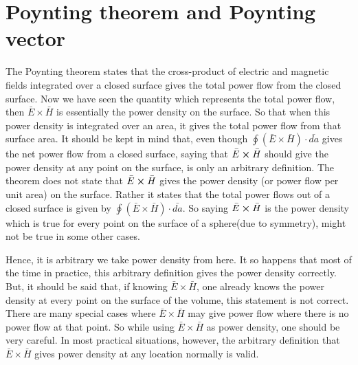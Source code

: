 \section{Poynting theorem and Poynting vector}
The Poynting theorem states that the cross-product of electric and magnetic fields integrated over a closed surface gives the total power flow from the closed surface. Now we have seen the quantity which represents the total power flow, then $\bar{E}\times\bar{H}$ is essentially the power density on the surface. So that when this power density is integrated over an area, it gives the total power flow from that surface area.
It should be kept in mind that, even though $ \oint(\bar{E}\times\bar{H})\cdot\bar{da} $ gives the net power flow from a closed surface, saying that $\bar{E}\cross\bar{H}$ should give the power density at any point on the surface, is only an arbitrary definition. The theorem does not state that $\bar{E}\cross\bar{H}$ gives the power density (or power flow per unit area) on the surface. Rather it states that the total power flows out of a closed surface is given by $ \oint(\bar{E}\times\bar{H})\cdot\bar{da} $. So saying $\bar{E}\cross\bar{H}$ is the power density which is true for every point on the surface of a sphere(due to symmetry), might not be true in some other cases.

Hence, it is arbitrary we take power density from here. It so happens that most of the time in practice, this arbitrary definition gives the power density correctly. But, it should be said that, if knowing $\bar{E}\times\bar{H}$, one already knows the power density at every point on the surface of the volume, this statement is not correct. There are many special cases where $\bar{E}\times\bar{H}$  may give power flow where there is no power flow at that point. So while using $\bar{E}\times\bar{H}$  as power density, one should be very careful. In most practical situations, however, the arbitrary definition that $\bar{E}\times\bar{H}$  gives power density at any location normally is valid.

